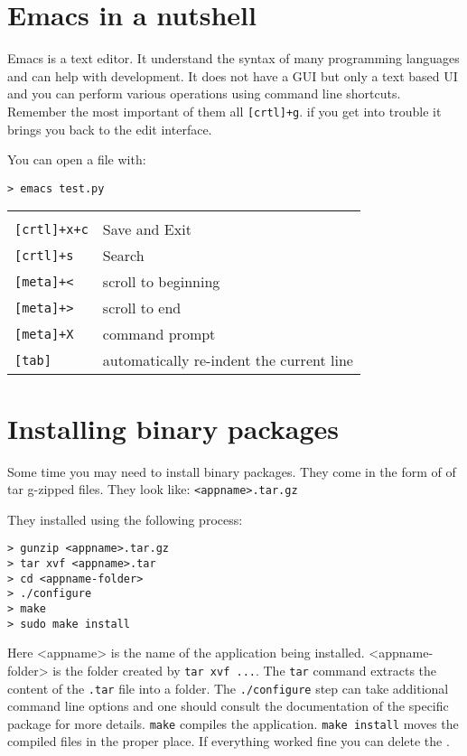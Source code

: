 \documentclass[justified,sixbynine]{tufte-book}
\def\ft{\small\tt}
\theoremstyle{plain}%
\theoremstyle{definition}
\theoremstyle{remark}
\begin{document}
\begin{fullwidth}
\section{Emacs in a nutshell}

Emacs is a text editor. It understand the syntax of many programming languages and can help with development. It does not have a GUI but only a text based UI and you can perform various operations using command line shortcuts. Remember the most important of them all {\ft [crtl]+g}. if you get into trouble it brings you back to the edit interface.

You can open a file with:
\begin{lstlisting}
> emacs test.py
\end{lstlisting}
\begin{tabular}{ll} \hline \\
{\ft [crtl]+x+c} & Save and Exit \\
{\ft [crtl]+s} & Search \\
{\ft [meta]+<} & scroll to beginning \\
{\ft [meta]+>} & scroll to end \\
{\ft [meta]+X} & command prompt \\
{\ft [tab]} & automatically re-indent the current line \\
\hline
\end{tabular}

\section{Installing binary packages}

Some time you may need to install binary packages. They come in the form of of tar g-zipped files. They look like: {\ft <appname>.tar.gz}

They installed using the following process:

\begin{lstlisting}
> gunzip <appname>.tar.gz
> tar xvf <appname>.tar
> cd <appname-folder>
> ./configure
> make
> sudo make install
\end{lstlisting}

Here <appname> is the name of the application being installed. <appname-folder> is the folder created by {\ft tar xvf ...}. The {\ft tar} command extracts the content of the {\ft .tar} file into a folder. The {\ft ./configure} step can take additional command line options and one should consult the documentation of the specific package for more details. {\ft make} compiles the application. {\ft make install} moves the compiled files in the proper place. If everything worked fine you can delete the {\ft <appname-folder>}.


\end{fullwidth}
\end{document}
